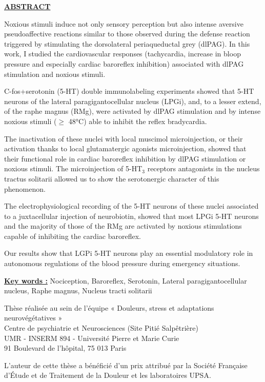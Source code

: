 \documentclass[a4paper,12pt,twoside]{report}
\begin{document}
\hrulefill
\begin{center}
\underline{\textbf{ABSTRACT}}
\end{center}
\begin{small}
Noxious stimuli induce not only sensory perception but also intense aversive pseudoaffective reactions similar to those observed during the defense reaction triggered by stimulating the dorsolateral periaqueductal grey (dlPAG). In this work, I studied the cardiovascular responses (tachycardia, increase in bloop pressure and especially cardiac baroreflex inhibition) associated with dlPAG stimulation and noxious stimuli.

C-fos+serotonin (5-HT) double immunolabeling experiments showed that 5-HT neurons of the lateral paragigantocellular nucleus (LPGi), and, to a lesser extend, of the raphe magnus (RMg), were activated by dlPAG stimulation and by intense noxious stimuli ($\ge$ 48°C) able to inhibit the reflex bradycardia.

The inactivation of these nuclei with local muscimol microinjection, or their activation thanks to local glutamatergic agonists microinjection, showed that their functional role in cardiac baroreflex inhibition by dlPAG stimulation or noxious stimuli. The microinjection of 5-HT$_{3}$ receptors antagonists in the nucleus tractus solitarii allowed us to show the serotonergic character of this phenomenon.

The electrophysiological recording of the 5-HT neurons of these nuclei associated to a juxtacellular injection of neurobiotin, showed that most LPGi 5-HT neurons and the majority of those of the RMg are activated by noxious stimulations capable of inhibiting the cardiac baroreflex.

Our results show that LGPi 5-HT neurons play an essential modulatory role in autonomous regulations of the blood pressure during emergency situations. 
\begin{center}
\underline{\textbf{Key words :}} Nociception, Baroreflex, Serotonin, Lateral paragigantocellular nucleus, Raphe magnus, Nucleus tracti solitarii \end{center}
\end{small}
\hrulefill
\begin{center}
\noindent Thèse réalisée au sein de l’équipe « Douleurs, stress et adaptations neurovégétatives »
\\Centre de psychiatrie et Neurosciences (Site Pitié Salpêtrière)
\\UMR - INSERM 894 - Université Pierre et Marie Curie
\\91 Boulevard de l’hôpital, 75 013 Paris
\end{center}
\hrulefill

\noindent L’auteur de cette thèse a bénéficié d’un prix attribué par la Société Française d’Étude et de Traitement de la Douleur et les laboratoires UPSA.
\end{document}
